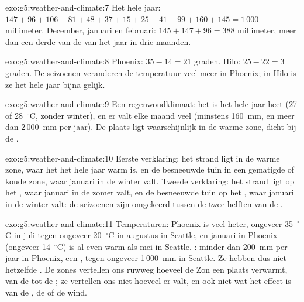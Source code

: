 \begin{solution}{exo:g5:weather-and-climate:7}
Het hele jaar: $147 + 96 + 106 + 81 + 48 + 37 + 15 + 25 + 41 + 99 + 160 + 145
= 1\,000$ millimeter. December, januari en februari:
$145 + 147 + 96 = 388$ millimeter, meer dan een derde van de  van het
jaar in drie maanden.
\end{solution}

\begin{solution}{exo:g5:weather-and-climate:8}
Phoenix: $35 - 14 = 21$ graden. Hilo: $25 - 22 = 3$ graden. De seizoenen
veranderen de temperatuur veel meer in Phoenix; in Hilo is ze het hele jaar
bijna gelijk.
\end{solution}

\begin{solution}{exo:g5:weather-and-climate:9}
Een regenwoudklimaat: het is het hele jaar heet (27 of 28~$^\circ$C, zonder
winter), en er valt elke maand veel  (minstens 160~mm, en meer dan
2\,000~mm per jaar). De plaats ligt waarschijnlijk in de warme zone, dicht
bij de .
\end{solution}

\begin{solution}{exo:g5:weather-and-climate:10}
Eerste verklaring: het strand ligt in de warme zone, waar het het hele jaar
warm is, en de besneeuwde tuin in een gematigde of koude zone, waar januari
in de winter valt. Tweede verklaring: het strand ligt op het , waar januari in de zomer valt, en de besneeuwde tuin op het
, waar januari in de winter valt: de seizoenen zijn
omgekeerd tussen de twee helften van de .
\end{solution}

\begin{solution}{exo:g5:weather-and-climate:11}
Temperaturen: Phoenix is veel heter, ongeveer 35~$^\circ$C in juli tegen
ongeveer 20~$^\circ$C in augustus in Seattle, en januari in Phoenix
(ongeveer 14~$^\circ$C) is al even warm als mei in Seattle. : minder
dan 200~mm per jaar in Phoenix, een , tegen ongeveer 1\,000~mm in
Seattle. Ze hebben dus niet hetzelfde . De zones vertellen ons
ruwweg hoeveel de Zon een plaats verwarmt, van de  tot de ; ze
vertellen ons niet hoeveel  er valt, en ook niet wat het effect is van
de , de  of de wind.
\end{solution}
